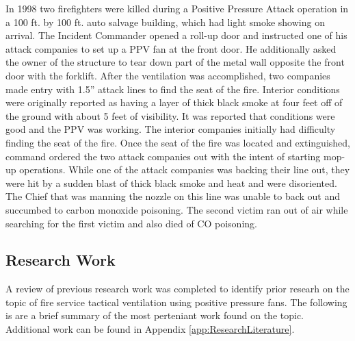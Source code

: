\documentclass{article}
\begin{document}
In 1998 two firefighters were killed during a Positive Pressure Attack operation in a 100 ft. by 100 ft. auto salvage building, which had light smoke showing on arrival. The Incident Commander opened a roll-up door and instructed one of his attack companies to set up a PPV fan at the front door. He additionally asked the owner of the structure to tear down part of the metal wall opposite the front door with the forklift. After the ventilation was accomplished, two companies made entry with 1.5” attack lines to find the seat of the fire. Interior conditions were originally reported as having a layer of thick black smoke at four feet off of the ground with about 5 feet of visibility. It was reported that conditions were good and the PPV was working. The interior companies initially had difficulty finding the seat of the fire. Once the seat of the fire was located and extinguished, command ordered the two attack companies out with the intent of starting mop-up operations. While one of the attack companies was backing their line out, they were hit by a sudden blast of thick black smoke and heat and were disoriented. The Chief that was manning the nozzle on this line was unable to back out and succumbed to carbon monoxide poisoning. The second victim ran out of air while searching for the first victim and also died of CO poisoning.\cite{NIOSHF1998_32}

\subsection{Research Work}
A review of previous research work was completed to identify prior researh on the topic of fire service tactical ventilation using positive pressure fans. The following is are a brief summary of the most perteniant work found on the topic. Additional work can be found in Appendix \ref{app:ResearchLiterature}.

\end{document}
